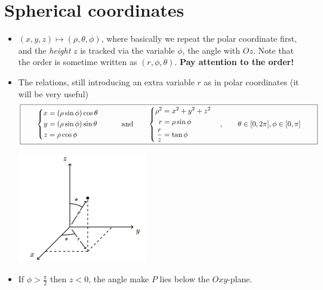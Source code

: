 \section{Spherical coordinates}
\begin{itemize}
    \item $(x,y,z)\mapsto (\rho, \theta,\phi)$, where basically we repeat the polar coordinate first, and the \emph{height} $z$ is tracked via the variable $\phi$, the angle with $Oz$. 
    Note that the order is sometime written as $(r,\phi, \theta)$. \textbf{Pay attention to the order!}
    \item The relations, still introducing an extra variable $r$ as in polar coordinates (it will be very useful)\color{red}
    \begin{equation*}
    \fbox{$
    \qquad
        \begin{cases}
            \begin{aligned}
                x &= (\rho \sin \phi) \cos \theta \\
                y &= (\rho \sin \phi) \sin \theta \\
                z &= \rho \cos \phi
            \end{aligned}
        \end{cases} \qquad 
        \text{and}\qquad 
        \begin{cases}
            \begin{aligned}
                 \rho^2 &= x^2+y^2+z^2 \\
                r &= \rho \sin \phi \\
                \frac{r}{z} &= \tan \phi
            \end{aligned}
        \end{cases}, \qquad \theta \in  [0,2\pi], \phi\in [0,\pi]
        \qquad
        $}
    \end{equation*}
    \begin{center}
        \includegraphics[scale=0.7]{content/09-spherical.png}
    \end{center}\color{black}
    \item If $\phi > \frac{\pi}{2}$ then $z<0$, the angle make $P$ lies below the $Oxy$-plane.
    

\end{itemize}

